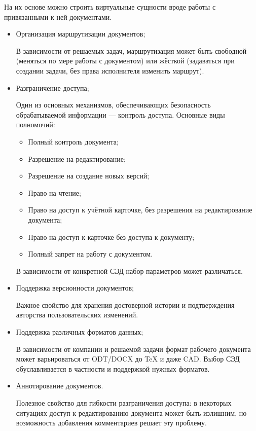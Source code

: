 На их основе можно строить виртуальные сущности вроде работы с привязанными к ней документами.
\begin{itemize}
	\item Организация маршрутизации документов;

	В зависимости от решаемых задач, маршрутизация может быть свободной (меняться по мере работы с документом) или жёсткой (задаваться при создании задачи, без права исполнителя изменить маршрут).
	\item Разграничение доступа;

	Один из основных механизмов, обеспечивающих безопасность обрабатываемой информации --- контроль доступа. Основные виды полномочий:
	\begin{itemize}
		\item Полный контроль документа;
		\item Разрешение на редактирование;
		\item Разрешение на создание новых версий;
		\item Право на чтение;
		\item Право на доступ к учётной карточке, без разрешения на редактирование документа;
		\item Право на доступ к карточке без доступа к документу;
		\item Полный запрет на работу с документом.
	\end{itemize}
	В зависимости от конкретной СЭД набор параметров может различаться.
	\item Поддержка версионности документов;

	Важное свойство для хранения достоверной истории и подтверждения авторства пользовательских изменений.
	\item Поддержка различных форматов данных;

	В зависимости от компании и решаемой задачи формат рабочего документа может варьироваться от ODT/DOCX до TeX и даже CAD. Выбор СЭД обуславливается в частности и поддержкой нужных форматов.
	\item Аннотирование документов.

	Полезное свойство для гибкости разграничения доступа: в некоторых ситуациях доступ к редактированию документа может быть излишним, но возможность добавления комментариев решает эту проблему.
\end{itemize}